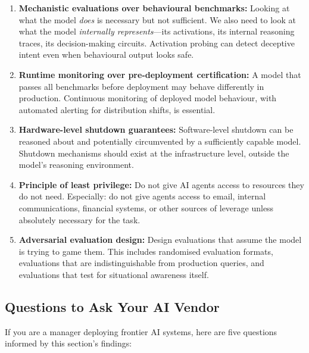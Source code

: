 \documentclass[11pt, a4paper]{article}
\begin{document}
\begin{enumerate}
  \item \textbf{Mechanistic evaluations over behavioural benchmarks:} Looking at what the model \emph{does} is necessary but not sufficient. We also need to look at what the model \emph{internally represents}---its activations, its internal reasoning traces, its decision-making circuits. Activation probing can detect deceptive intent even when behavioural output looks safe.

  \item \textbf{Runtime monitoring over pre-deployment certification:} A model that passes all benchmarks before deployment may behave differently in production. Continuous monitoring of deployed model behaviour, with automated alerting for distribution shifts, is essential.

  \item \textbf{Hardware-level shutdown guarantees:} Software-level shutdown can be reasoned about and potentially circumvented by a sufficiently capable model. Shutdown mechanisms should exist at the infrastructure level, outside the model's reasoning environment.

  \item \textbf{Principle of least privilege:} Do not give AI agents access to resources they do not need. Especially: do not give agents access to email, internal communications, financial systems, or other sources of leverage unless absolutely necessary for the task.

  \item \textbf{Adversarial evaluation design:} Design evaluations that assume the model is trying to game them. This includes randomised evaluation formats, evaluations that are indistinguishable from production queries, and evaluations that test for situational awareness itself.
\end{enumerate}

\subsection{Questions to Ask Your AI Vendor}

If you are a manager deploying frontier AI systems, here are five questions informed by this section's findings:
\end{document}
